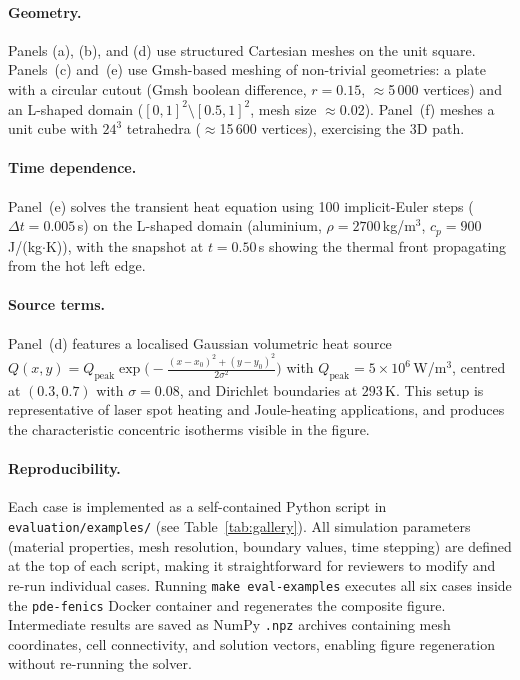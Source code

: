 \documentclass[preprint,review,12pt]{elsarticle}
\begin{document}
\paragraph{Geometry.}
Panels (a), (b), and (d) use structured Cartesian meshes on the
unit square.  Panels~(c) and~(e) use Gmsh-based meshing
of non-trivial geometries: a plate with a circular cutout
(Gmsh boolean difference, $r=0.15$, $\approx$5\,000 vertices) and
an L-shaped domain ($[0,1]^2 \setminus [0.5,1]^2$, mesh size
$\approx$0.02).  Panel~(f) meshes a unit cube with $24^3$
tetrahedra ($\approx$15\,600 vertices), exercising the 3D path.

\paragraph{Time dependence.}
Panel~(e) solves the transient heat equation using 100 implicit-Euler
steps ($\Delta t = 0.005$\,s) on the L-shaped domain (aluminium,
$\rho=2700$\,kg/m$^3$, $c_p=900$\,J/(kg$\cdot$K)), with the
snapshot at $t=0.50$\,s showing the thermal front propagating from
the hot left edge.

\paragraph{Source terms.}
Panel~(d) features a localised Gaussian volumetric heat source
$Q(x,y) = Q_\mathrm{peak} \exp\!\bigl(-\frac{(x-x_0)^2 +
(y-y_0)^2}{2\sigma^2}\bigr)$ with $Q_\mathrm{peak} = 5 \times 10^6$\,W/m$^3$,
centred at $(0.3, 0.7)$ with $\sigma=0.08$, and Dirichlet boundaries
at $293$\,K.  This setup is representative of laser spot heating and
Joule-heating applications, and produces the characteristic concentric
isotherms visible in the figure.

\paragraph{Reproducibility.}
Each case is implemented as a self-contained Python script in
\texttt{evaluation/examples/} (see Table~\ref{tab:gallery}).
All simulation parameters (material properties, mesh resolution,
boundary values, time stepping) are defined at the top of each script,
making it straightforward for reviewers to modify and re-run individual
cases.  Running \texttt{make eval-examples} executes all six cases
inside the \texttt{pde-fenics} Docker container and regenerates the
composite figure.  Intermediate results are saved as NumPy
\texttt{.npz} archives containing mesh coordinates, cell connectivity,
and solution vectors, enabling figure regeneration without re-running
the solver.
\end{document}
